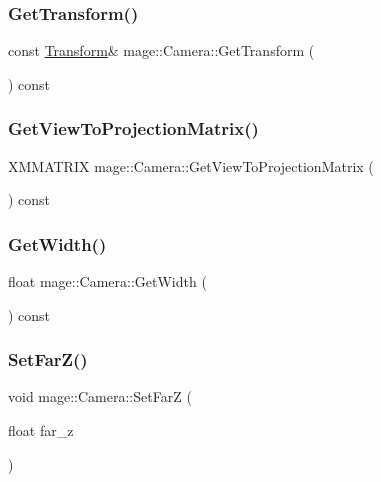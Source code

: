 \subsubsection{\texorpdfstring{Get\+Transform()}{GetTransform()}\hspace{0.1cm}{\footnotesize\ttfamily [2/2]}}
{\footnotesize\ttfamily const \hyperlink{structmage_1_1_transform}{Transform}\& mage\+::\+Camera\+::\+Get\+Transform (\begin{DoxyParamCaption}{ }\end{DoxyParamCaption}) const}

\hypertarget{classmage_1_1_camera_a4254e1c9d65c41b27842f35870fd7960}{}\label{classmage_1_1_camera_a4254e1c9d65c41b27842f35870fd7960} 
\subsubsection{\texorpdfstring{Get\+View\+To\+Projection\+Matrix()}{GetViewToProjectionMatrix()}}
{\footnotesize\ttfamily X\+M\+M\+A\+T\+R\+IX mage\+::\+Camera\+::\+Get\+View\+To\+Projection\+Matrix (\begin{DoxyParamCaption}{ }\end{DoxyParamCaption}) const}

\hypertarget{classmage_1_1_camera_a2285655605035118861297b2449a3443}{}\label{classmage_1_1_camera_a2285655605035118861297b2449a3443} 
\subsubsection{\texorpdfstring{Get\+Width()}{GetWidth()}}
{\footnotesize\ttfamily float mage\+::\+Camera\+::\+Get\+Width (\begin{DoxyParamCaption}{ }\end{DoxyParamCaption}) const}

\hypertarget{classmage_1_1_camera_aaad9cb302d7ceb2515c2a23f094a6ce9}{}\label{classmage_1_1_camera_aaad9cb302d7ceb2515c2a23f094a6ce9} 
\subsubsection{\texorpdfstring{Set\+Far\+Z()}{SetFarZ()}}
{\footnotesize\ttfamily void mage\+::\+Camera\+::\+Set\+FarZ (\begin{DoxyParamCaption}\item[{float}]{far\+\_\+z }\end{DoxyParamCaption})}

